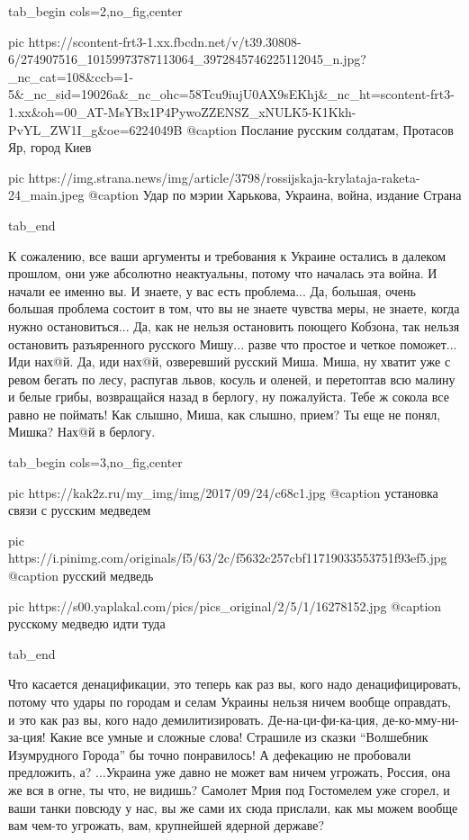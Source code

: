 \ifcmt
  tab_begin cols=2,no_fig,center

     pic https://scontent-frt3-1.xx.fbcdn.net/v/t39.30808-6/274907516_10159973787113064_3972845746225112045_n.jpg?_nc_cat=108&ccb=1-5&_nc_sid=19026a&_nc_ohc=58Tcu9iujU0AX9sEKhj&_nc_ht=scontent-frt3-1.xx&oh=00_AT-MsYBx1P4PywoZZENSZ_xNULK5-K1Kkh-PvYL_ZW1I_g&oe=6224049B
		 @caption Послание русским солдатам, Протасов Яр, город Киев 

		 pic https://img.strana.news/img/article/3798/rossijskaja-krylataja-raketa-24_main.jpeg
		 @caption Удар по мэрии Харькова, Украина, война, издание Страна

  tab_end
\fi

К сожалению, все ваши аргументы и требования к Украине остались в далеком
прошлом, они уже абсолютно неактуальны, потому что началась эта война. И начали
ее именно вы. И знаете, у вас есть проблема... Да, большая, очень большая
проблема состоит в том, что вы не знаете чувства меры, не знаете, когда нужно
остановиться... Да, как не нельзя остановить поющего Кобзона, так нельзя
остановить разъяренного русского Мишу...  разве что простое и четкое поможет...
Иди нах@й. Да, иди нах@й, озверевший русский Миша. Миша, ну хватит уже с ревом
бегать по лесу, распугав львов, косуль и оленей, и перетоптав всю малину и
белые грибы, возвращайся назад в берлогу, ну пожалуйста. Тебе ж сокола все
равно не поймать! Как слышно, Миша, как слышно, прием? Ты еще не понял, Мишка?
Нах@й в берлогу.

\ifcmt
  tab_begin cols=3,no_fig,center

     pic https://kak2z.ru/my_img/img/2017/09/24/c68c1.jpg
		 @caption установка связи с русским медведем

		 pic https://i.pinimg.com/originals/f5/63/2c/f5632c257cbf11719033553751f93ef5.jpg
		 @caption русский медведь

		 pic https://s00.yaplakal.com/pics/pics_original/2/5/1/16278152.jpg
		 @caption русскому медведю идти туда 

  tab_end
\fi

Что касается денацификации, это теперь как раз вы, кого надо денацифицировать,
потому что удары по городам и селам Украины нельзя ничем вообще оправдать, и
это как раз вы, кого надо демилитизировать. Де-на-ци-фи-ка-ция,
де-ко-мму-ни-за-ция! Какие все умные и сложные слова! Страшиле из сказки
\enquote{Волшебник Изумрудного Города} бы точно понравилось! А дефекацию не
пробовали предложить, а? ...Украина уже давно не может вам ничем угрожать,
Россия, она же вся в огне, ты что, не видишь?  Самолет Мрия под Гостомелем уже
сгорел, и ваши танки повсюду у нас, вы же сами их сюда прислали, как мы можем
вообще вам чем-то угрожать, вам, крупнейшей ядерной державе?


